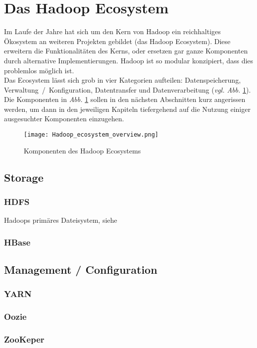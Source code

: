 \section{Das Hadoop Ecosystem}
Im Laufe der Jahre hat sich um den Kern von Hadoop ein reichhaltiges Ökosystem an weiteren Projekten gebildet (das Hadoop Ecosystem). Diese erweitern die Funktionalitäten des Kerns, oder ersetzen gar ganze Komponenten durch alternative Implementierungen. Hadoop ist so modular konzipiert, dass dies problemlos möglich ist.  \\
Das Ecosystem lässt sich grob in vier Kategorien aufteilen: Datenspeicherung, Verwaltung~/~Konfiguration, Datentransfer und Datenverarbeitung (\textit{vgl. Abb. }\ref{fig:ecosys}). Die Komponenten in \textit{Abb. }\ref{fig:ecosys} sollen in den nächsten Abschnitten kurz angerissen werden, um dann in den jeweiligen Kapiteln tiefergehend auf die Nutzung einiger ausgesuchter Komponenten einzugehen.

\begin{figure}[ht]
    \centering
    \texttt{[image: Hadoop\_ecosystem\_overview.png]}
    \caption[Komponenten des Hadoop Ecosystems]{Komponenten des Hadoop Ecosystems\parencite{van_der_weel_hadoop_2015}}
    \label{fig:ecosys}
\end{figure}

\subsection{Storage}
\subsubsection*{HDFS}
Hadoops primäres Dateisystem, siehe 
\subsubsection*{HBase}

\subsection{Management / Configuration}
\subsubsection*{YARN}
\subsubsection*{Oozie}
\subsubsection*{ZooKeper}
